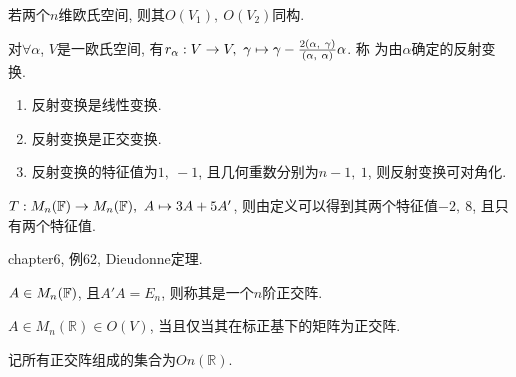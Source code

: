 \begin{example}
    若两个$n$维欧氏空间, 则其$O(V_1),\ O(V_2)$同构.
\end{example}

\begin{definition}[反射变换]
    对$\forall \alpha$, $V$是一欧氏空间, 有$\defmap{r_{\alpha}}{V}{V}{\gamma}{\gamma-\frac{2(\alpha,\ \gamma)}{(\alpha,\ \alpha)}\alpha}$. 称
    为由$\alpha$确定的反射变换.
\end{definition}

\begin{property}
    \par
    \begin{enumerate}[itemindent=1em]
        \item 反射变换是线性变换.
        \item 反射变换是正交变换.
        \item 反射变换的特征值为$1,\ -1$, 且几何重数分别为$n-1,\ 1$, 则反射变换可对角化.
    \end{enumerate}
\end{property}

\begin{example}
    $T: M_{n}(\mathbb{F}) \to M_{n}(\mathbb{F}),\ A \mapsto 3A+5A'$, 则由定义可以得到其两个特征值$-2,\ 8$, 且只有两个特征值.
\end{example}

\begin{example}
    chapter6, 例62, Dieudonne定理.
\end{example}

\begin{definition}[正交阵]
    $A\in M_{n}(\mathbb{F})$, 且$A'A=E_n$, 则称其是一个$n$阶正交阵.
\end{definition}

\begin{theorem}[正交阵的充要条件]
    $A\in M_n(\mathbb{R})\in O(V)$, 当且仅当其在标正基下的矩阵为正交阵.\par
    记所有正交阵组成的集合为$On(\mathbb{R})$.
\end{theorem}

